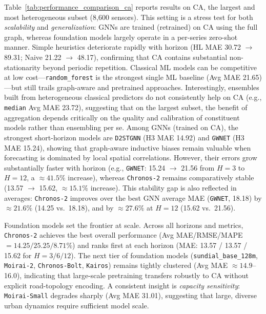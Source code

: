 \documentclass[10pt]{article}
\begin{document}
Table~\ref{tab:performance_comparison_ca} reports results on CA, the largest and most heterogeneous subset
(8,600 sensors). This setting is a stress test for both \emph{scalability} and \emph{generalization}: GNNs are
trained (retrained) on CA using the full graph, whereas foundation models largely operate in a per-series
zero-shot manner. Simple heuristics deteriorate rapidly with horizon (HL MAE 30.72 $\rightarrow$ 89.31; Naive 21.22 $\rightarrow$ 48.17),
confirming that CA contains substantial non-stationarity beyond periodic repetition. Classical ML models can be
competitive at low cost---\texttt{random\_forest} is the strongest single ML baseline (Avg MAE 21.65)---but still trails
graph-aware and pretrained approaches. Interestingly, ensembles built from heterogeneous classical predictors do not
consistently help on CA (e.g., \texttt{median} Avg MAE 23.72), suggesting that on the largest subset, the benefit of
aggregation depends critically on the quality and calibration of constituent models rather than ensembling per se. Among GNNs (trained on CA), the strongest short-horizon models are \texttt{D2STGNN} (H3 MAE 14.92) and
\texttt{GWNET} (H3 MAE 15.24), showing that graph-aware inductive biases remain valuable when forecasting is dominated
by local spatial correlations. However, their errors grow substantially faster with horizon (e.g., \texttt{GWNET}:
15.24 $\rightarrow$ 21.56 from $H=3$ to $H=12$, a $\approx 41.5\%$ increase), whereas \texttt{Chronos-2} remains
comparatively stable (13.57 $\rightarrow$ 15.62, $\approx 15.1\%$ increase). This stability gap is also reflected in
averages: \texttt{Chronos-2} improves over the best GNN average MAE (\texttt{GWNET}, 18.18) by $\approx 21.6\%$
(14.25 vs.\ 18.18), and by $\approx 27.6\%$ at $H=12$ (15.62 vs.\ 21.56).

{Foundation models set the frontier at scale.}
Across all horizons and metrics, \texttt{Chronos-2} achieves the best overall performance (Avg MAE/RMSE/MAPE
$=14.25/25.25/8.71\%$) and ranks first at each horizon (MAE: 13.57 / 13.57 / 15.62 for $H=3/6/12$).
The next tier of foundation models (\texttt{sundial\_base\_128m}, \texttt{Moirai-2}, \texttt{Chronos-Bolt}, \texttt{Kairos})
remains tightly clustered (Avg MAE $\approx 14.9$--16.0), indicating that large-scale pretraining transfers robustly
to CA without explicit road-topology encoding. A consistent insight is \emph{capacity sensitivity}:
\texttt{Moirai-Small} degrades sharply (Avg MAE 31.01), suggesting that large, diverse urban dynamics require
sufficient model scale.
\end{document}
